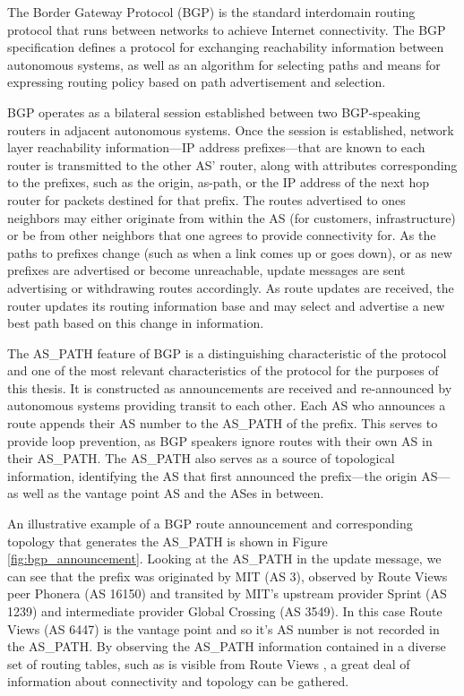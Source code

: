 The Border Gateway Protocol (BGP) is the standard interdomain routing protocol that runs between networks to achieve Internet connectivity. The BGP specification defines a protocol for exchanging reachability information between autonomous systems, as well as an algorithm for selecting paths and means for expressing routing policy based on path advertisement and selection.

BGP operates as a bilateral session established between two BGP-speaking routers in adjacent autonomous systems. Once the session is established, network layer reachability information---IP address prefixes---that are known to each router is transmitted to the other AS' router, along with attributes corresponding to the prefixes, such as the origin, as-path, or the IP address of the next hop router for packets destined for that prefix. The routes advertised to ones neighbors may either originate from within the AS (for customers, infrastructure) or be from  other neighbors that one agrees to provide connectivity for. As the paths to prefixes change (such as when a link comes up or goes down), or as new prefixes are advertised or become unreachable, update messages are sent advertising or withdrawing routes accordingly. As route updates are received, the router updates its routing information base and may select and advertise a new best path based on this change in information.

The AS\_PATH feature of BGP is a distinguishing characteristic of the protocol and one of the most relevant characteristics of the protocol for the purposes of this thesis. It is constructed as announcements are received and re-announced by autonomous systems providing transit to each other. Each AS who announces a route appends their AS number to the AS\_PATH of the prefix. This serves to provide loop prevention, as BGP speakers ignore routes with their own AS in their AS\_PATH. The AS\_PATH also serves as a source of topological information, identifying the AS that first announced the prefix---the origin AS---as well as the vantage point AS and the ASes in between.

 An illustrative example of a BGP route announcement and corresponding topology that generates the AS\_PATH is shown in Figure \ref{fig:bgp_announcement}. Looking at the AS\_PATH in the update message, we can see that the prefix was originated by MIT (AS 3), observed by Route Views peer Phonera (AS 16150) and transited by MIT's upstream provider Sprint (AS 1239) and intermediate provider Global Crossing (AS 3549). In this case Route Views (AS 6447) is the vantage point and so it's AS number is not recorded in the AS\_PATH. By observing the AS\_PATH information contained in a diverse set of routing tables, such as is visible from Route Views \cite{Routeviews}, a great deal of information about connectivity and topology can be gathered. 

